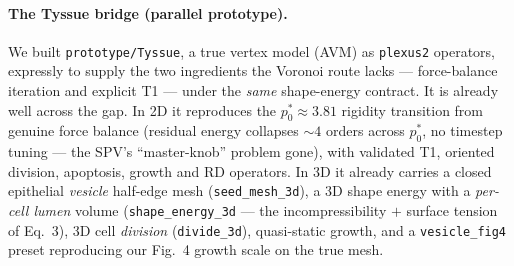 \documentclass[11pt]{article}
\begin{document}
\paragraph{The Tyssue bridge (parallel prototype).} We built \texttt{prototype/Tyssue}, a true vertex
model (AVM) as \texttt{plexus2} operators, expressly to supply the two ingredients the Voronoi route
lacks --- force-balance iteration and explicit T1 --- under the \emph{same} shape-energy contract. It is
already well across the gap. In 2D it reproduces the $p_0^*\!\approx\!3.81$ rigidity transition from
genuine force balance (residual energy collapses $\sim\!4$ orders across $p_0^*$, no timestep tuning ---
the SPV's ``master-knob'' problem gone), with validated T1, oriented division, apoptosis, growth and RD
operators. In 3D it already carries a closed epithelial \emph{vesicle} half-edge mesh
(\texttt{seed\_mesh\_3d}), a 3D shape energy with a \emph{per-cell lumen} volume (\texttt{shape\_energy\_3d}
--- the incompressibility $+$ surface tension of Eq.~3), 3D cell \emph{division} (\texttt{divide\_3d}),
quasi-static growth, and a \texttt{vesicle\_fig4} preset reproducing our Fig.~4 growth scale on the true
mesh.
\end{document}
